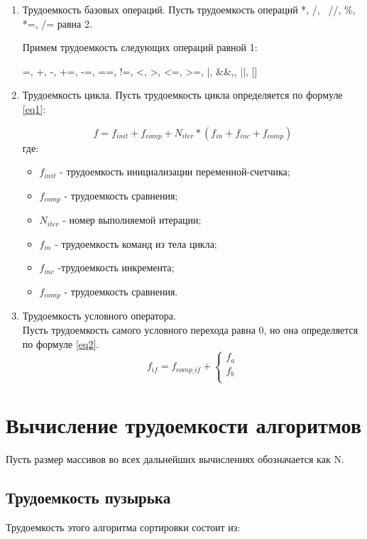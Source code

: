 \begin{enumerate}
	\item Трудоемкость базовых операций.
	Пусть трудоемкость операций *, /, \, //, \%, *=, /= равна 2. 
	
	Примем трудоемкость следующих операций равной 1:
	
	=, +, -, +=, -=, ==, !=, <, >, <=, >=, |, \&\&,, ||, []  
	\item Трудоемкость цикла.
	Пусть трудоемкость цикла определяется по формуле \ref{eq1}:
	
	\begin{equation}
	\label{eq1} 
	f = f_{init} + f_{comp} + N_{iter} * (f_{in} + f_{inc} + f_{comp})
	\end{equation} 
	где:
	\begin{itemize}
	\item $f_{init}$ - трудоемкость инициализации переменной-счетчика;
	\item $f_{comp}$ - трудоемкость сравнения;
	\item $N_{iter}$ - номер выполняемой итерации;
	\item $f_{in}$ - трудоемкость команд из тела цикла;
	\item $f_{inc}$ -трудоемкость инкремента;
	\item $f_{comp}$ - трудоемкость сравнения.
	\end{itemize}
	\item Трудоемкость условного оператора. \\
	Пусть трудоемкость самого условного перехода равна 0, но она определяется по формуле \ref{eq2}. 
	\begin{equation}
		\label{eq2}
		f_{if} = f_{comp\_if} + \begin{cases}
								f_{a}\\
								f_{b}\\
								\end{cases}
	\end{equation}

\end{enumerate}
	

\section{Вычисление трудоемкости алгоритмов}
Пусть размер массивов во всех дальнейших вычислениях обозначается как N.
\subsection{Трудоемкость пузырька}
Трудоемкость этого алгоритма сортировки состоит из:

